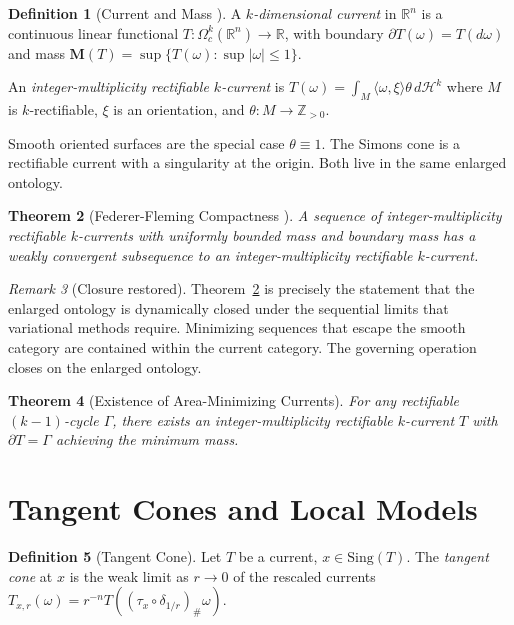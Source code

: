 \documentclass[12pt,oneside]{book}
\theoremstyle{plain}
\newtheorem{theorem}{Theorem}[chapter]
\theoremstyle{definition}
\newtheorem{definition}[theorem]{Definition}
\theoremstyle{remark}
\newtheorem{remark}[theorem]{Remark}
\newcommand{\Real}{\mathbb{R}}
\begin{document}
\begin{definition}[Current and Mass \cite{federer1969}]
A \emph{$k$-dimensional current} in $\Real^n$ is a continuous linear
functional $T : \Omega^k_c(\Real^n) \to \Real$, with boundary
$\partial T(\omega) = T(d\omega)$ and mass
$\mathbf{M}(T) = \sup\{T(\omega) : \sup|\omega| \leq 1\}$.

An \emph{integer-multiplicity rectifiable $k$-current} is
$T(\omega) = \int_M \langle\omega, \xi\rangle\theta\, d\mathcal{H}^k$
where $M$ is $k$-rectifiable, $\xi$ is an orientation, and
$\theta : M \to \mathbb{Z}_{>0}$.
\end{definition}

Smooth oriented surfaces are the special case $\theta \equiv 1$.
The Simons cone is a rectifiable current with a singularity at the origin.
Both live in the same enlarged ontology.

\begin{theorem}[Federer-Fleming Compactness \cite{federer1969}]
\label{thm:FF}
A sequence of integer-multiplicity rectifiable $k$-currents with uniformly
bounded mass and boundary mass has a weakly convergent subsequence to an
integer-multiplicity rectifiable $k$-current.
\end{theorem}

\begin{remark}[Closure restored]
Theorem~\ref{thm:FF} is precisely the statement that the enlarged ontology
is dynamically closed under the sequential limits that variational methods
require. Minimizing sequences that escape the smooth category are contained
within the current category. The governing operation closes on the enlarged
ontology.
\end{remark}

\begin{theorem}[Existence of Area-Minimizing Currents]
For any rectifiable $(k-1)$-cycle $\Gamma$, there exists an integer-multiplicity
rectifiable $k$-current $T$ with $\partial T = \Gamma$ achieving the minimum
mass.
\end{theorem}

\section{Tangent Cones and Local Models}

\begin{definition}[Tangent Cone]
Let $T$ be a current, $x \in \mathrm{Sing}(T)$. The \emph{tangent cone} at $x$
is the weak limit as $r \to 0$ of the rescaled currents
$T_{x,r}(\omega) = r^{-n}T((\tau_x \circ \delta_{1/r})_\#\omega)$.
\end{definition}
\end{document}
